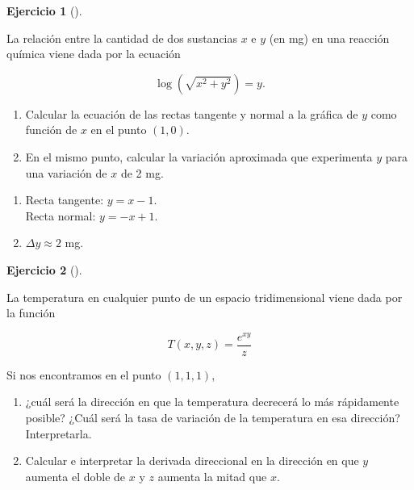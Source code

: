 \documentclass[
  a4paper,
]{scrreport}
\providecommand{\tightlist}{%
  \setlength{\itemsep}{0pt}\setlength{\parskip}{0pt}}\usepackage{longtable,booktabs,array}
\theoremstyle{definition}
\newtheorem{exercise}{Ejercicio}[chapter]
\theoremstyle{remark}
\begin{document}
\begin{exercise}[]\protect\hypertarget{exr-1}{}\label{exr-1}

La relación entre la cantidad de dos sustancias \(x\) e \(y\) (en mg) en
una reacción química viene dada por la ecuación

\[
\log(\sqrt{x^2+y^2}) = y.
\]

\begin{enumerate}
\def\labelenumi{\arabic{enumi}.}
\item
  Calcular la ecuación de las rectas tangente y normal a la gráfica de
  \(y\) como función de \(x\) en el punto \((1,0)\).
\item
  En el mismo punto, calcular la variación aproximada que experimenta
  \(y\) para una variación de \(x\) de 2 mg.
\end{enumerate}

\end{exercise}

\begin{tcolorbox}[enhanced jigsaw, opacitybacktitle=0.6, titlerule=0mm, bottomtitle=1mm, toptitle=1mm, breakable, bottomrule=.15mm, left=2mm, opacityback=0, toprule=.15mm, leftrule=.75mm, colframe=quarto-callout-tip-color-frame, coltitle=black, rightrule=.15mm, colback=white, title=\textcolor{quarto-callout-tip-color}{\faLightbulb}\hspace{0.5em}{Solución}, arc=.35mm, colbacktitle=quarto-callout-tip-color!10!white]

\begin{enumerate}
\def\labelenumi{\arabic{enumi}.}
\tightlist
\item
  Recta tangente: \(y=x-1\).\\
  Recta normal: \(y=-x+1\).
\item
  \(\Delta y\approx 2\) mg.
\end{enumerate}

\end{tcolorbox}

\begin{exercise}[]\protect\hypertarget{exr-2}{}\label{exr-2}

La temperatura en cualquier punto de un espacio tridimensional viene
dada por la función

\[
T(x,y,z)= \frac{e^{xy}}{z}
\]

Si nos encontramos en el punto \((1,1,1)\),

\begin{enumerate}
\def\labelenumi{\arabic{enumi}.}
\item
  ¿cuál será la dirección en que la temperatura decrecerá lo más
  rápidamente posible? ¿Cuál será la tasa de variación de la temperatura
  en esa dirección? Interpretarla.
\item
  Calcular e interpretar la derivada direccional en la dirección en que
  \(y\) aumenta el doble de \(x\) y \(z\) aumenta la mitad que \(x\).
\end{enumerate}

\end{exercise}
\end{document}
